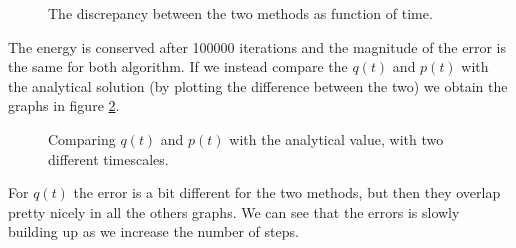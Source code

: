 \documentclass[../main.tex]{subfiles}
\begin{document}
\begin{figure}[H]
    \centering
    \begin{subfigure}{.45\textwidth}
        \centering
        
    \end{subfigure}
    \begin{subfigure}{.45\textwidth}
        \centering
        
    \end{subfigure}
    \caption{The discrepancy between the two methods as function of time.}
    \label{fig: ex_9_energy}
\end{figure}

The energy is conserved after 100000 iterations and the magnitude of the error is the same for both algorithm. If we instead compare the $q(t)$ and $p(t)$ with the analytical solution (by plotting the difference between the two) we obtain the graphs in figure \ref{fig: ex_9_comparison}.

\begin{figure}[H]
    \centering
    \begin{subfigure}{.45\textwidth}
        \centering
        
    \end{subfigure}
    \begin{subfigure}{.45\textwidth}
        \centering
        
    \end{subfigure}
    \begin{subfigure}{.45\textwidth}
        \centering
        
    \end{subfigure}
    \begin{subfigure}{.45\textwidth}
        \centering
        
    \end{subfigure}
    \caption{Comparing $q(t)$ and $p(t)$ with the analytical value, with two different timescales.}
    \label{fig: ex_9_comparison}
\end{figure}

For $q(t)$ the error is a bit different for the two methods, but then they overlap pretty nicely in all the others graphs. We can see that the errors is slowly building up as we increase the number of steps.
\end{document}
